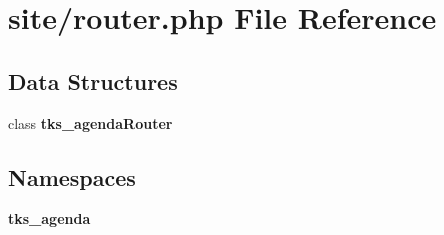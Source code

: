 \section{site/router.php File Reference}
\label{router_8php}
\subsection*{Data Structures}
\begin{DoxyCompactItemize}
\item 
class \textbf{ tks\+\_\+agenda\+Router}
\end{DoxyCompactItemize}
\subsection*{Namespaces}
\begin{DoxyCompactItemize}
\item 
 \textbf{ tks\+\_\+agenda}
\end{DoxyCompactItemize}
